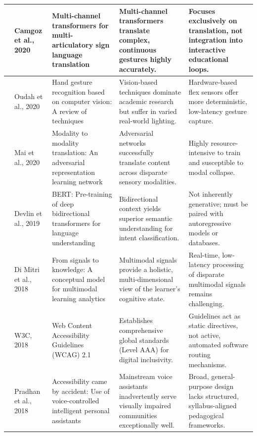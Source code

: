 \begin{longtable}{|p{1.2cm}|p{2.8cm}|p{4.2cm}|p{4.0cm}|p{3.8cm}|}
	\cite{jiang2021} & Camgoz et al., 2020 & Multi-channel transformers for multi-articulatory sign language translation & Multi-channel transformers translate complex, continuous gestures highly accurately. & Focuses exclusively on translation, not integration into interactive educational loops. \\
	\hline
	
	\cite{hashi2024} & Oudah et al., 2020 & Hand gesture recognition based on computer vision: A review of techniques & Vision-based techniques dominate academic research but suffer in varied real-world lighting. & Hardware-based flex sensors offer more deterministic, low-latency gesture capture. \\
	\hline
	
	\cite{mai2024} & Mai et al., 2020 & Modality to modality translation: An adversarial representation learning network & Adversarial networks successfully translate content across disparate sensory modalities. & Highly resource-intensive to train and susceptible to modal collapse. \\
	\hline
	
	\cite{devlin2019} & Devlin et al., 2019 & BERT: Pre-training of deep bidirectional transformers for language understanding & Bidirectional context yields superior semantic understanding for intent classification. & Not inherently generative; must be paired with autoregressive models or databases. \\
	\hline
	
	\cite{di2018} & Di Mitri et al., 2018 & From signals to knowledge: A conceptual model for multimodal learning analytics & Multimodal signals provide a holistic, multi-dimensional view of the learner's cognitive state. & Real-time, low-latency processing of disparate multimodal signals remains challenging. \\
	\hline
	
	\cite{w3c2018} & W3C, 2018 & Web Content Accessibility Guidelines (WCAG) 2.1 & Establishes comprehensive global standards (Level AAA) for digital inclusivity. & Guidelines act as static directives, not active, automated software routing mechanisms. \\
	\hline
	
	\cite{esquivel2024} & Pradhan et al., 2018 & Accessibility came by accident: Use of voice-controlled intelligent personal assistants & Mainstream voice assistants inadvertently serve visually impaired communities exceptionally well. & Broad, general-purpose design lacks structured, syllabus-aligned pedagogical frameworks. \\
	\hline
	

\end{longtable}
